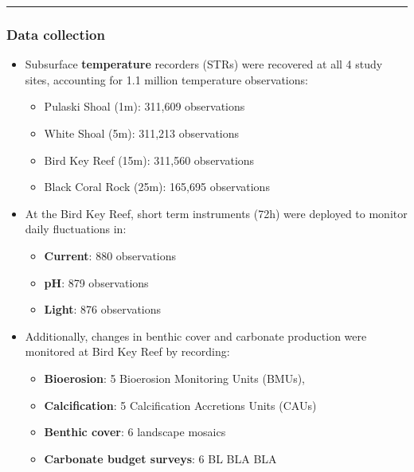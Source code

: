 \documentclass[]{article}
\providecommand{\tightlist}{%
  \setlength{\itemsep}{0pt}\setlength{\parskip}{0pt}}
\begin{document}
\begin{center}\rule{0.5\linewidth}{0.5pt}\end{center}

\hypertarget{data-collection}{%
\subsubsection{Data collection}\label{data-collection}}

\begin{itemize}
\tightlist
\item
  Subsurface \textbf{temperature} recorders (STRs) were recovered at all
  4 study sites, accounting for 1.1 million temperature observations:

  \begin{itemize}
  \tightlist
  \item
    Pulaski Shoal (1m): 311,609 observations
  \item
    White Shoal (5m): 311,213 observations
  \item
    Bird Key Reef (15m): 311,560 observations
  \item
    Black Coral Rock (25m): 165,695 observations
  \end{itemize}
\item
  At the Bird Key Reef, short term instruments (72h) were deployed to
  monitor daily fluctuations in:

  \begin{itemize}
  \tightlist
  \item
    \textbf{Current}: 880 observations
  \item
    \textbf{pH}: 879 observations
  \item
    \textbf{Light}: 876 observations
  \end{itemize}
\item
  Additionally, changes in benthic cover and carbonate production were
  monitored at Bird Key Reef by recording:

  \begin{itemize}
  \tightlist
  \item
    \textbf{Bioerosion}: 5 Bioerosion Monitoring Units (BMUs),
  \item
    \textbf{Calcification}: 5 Calcification Accretions Units (CAUs)
  \item
    \textbf{Benthic cover}: 6 landscape mosaics
  \item
    \textbf{Carbonate budget surveys}: 6 BL BLA BLA
  \end{itemize}
\end{itemize}
\end{document}
